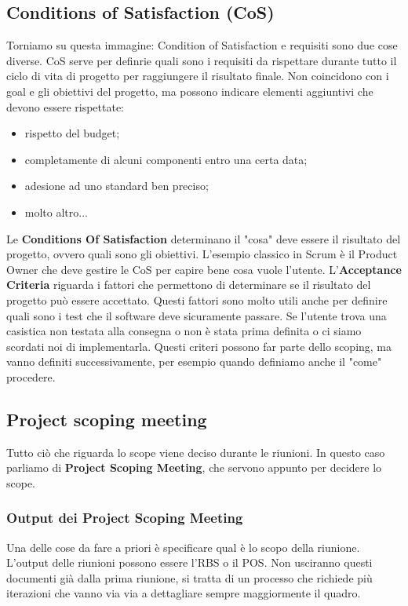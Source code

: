 \subsection{Conditions of Satisfaction (CoS)}
Torniamo su questa immagine:
\noindent Condition of Satisfaction e requisiti sono due cose diverse. CoS serve per definrie quali sono i requisiti da rispettare durante tutto il ciclo di vita di progetto per raggiungere il risultato finale. Non coincidono con i goal e gli obiettivi del progetto, ma possono indicare elementi aggiuntivi che devono essere rispettate:
\begin{itemize}
	\item rispetto del budget;
	\item completamente di alcuni componenti entro una certa data;
	\item adesione ad uno standard ben preciso;
	\item molto altro...
\end{itemize}
Le \textbf{Conditions Of Satisfaction} determinano il "cosa" deve essere il risultato del progetto, ovvero quali sono gli obiettivi. L'esempio classico in Scrum è il Product Owner che deve gestire le CoS per capire bene cosa vuole l'utente.
L'\textbf{Acceptance Criteria} riguarda i fattori che permettono di determinare se il risultato del progetto può essere accettato. Questi fattori sono molto utili anche per definire quali sono i test che il software deve sicuramente passare. Se l'utente trova una casistica non testata alla consegna o non è stata prima definita o ci siamo scordati noi di implementarla. Questi criteri possono far parte dello scoping, ma vanno definiti successivamente, per esempio quando definiamo anche il "come" procedere.
\subsection{Project scoping meeting}
Tutto ciò che riguarda lo scope viene deciso durante le riunioni. In questo caso parliamo di \textbf{Project Scoping Meeting}, che servono appunto per decidere lo scope.
\subsubsection{Output dei Project Scoping Meeting}
Una delle cose da fare a priori è specificare qual è lo scopo della riunione. L'output delle riunioni possono essere l'RBS o il POS. Non usciranno questi documenti già dalla prima riunione, si tratta di un processo che richiede più iterazioni che vanno via via a dettagliare sempre maggiormente il quadro.
